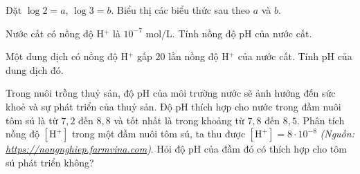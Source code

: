 \begin{bt}%
	Đặt $ \log 2=a $, $ \log 3=b $. Biểu thị các biểu thức sau theo $ a $ và $ b $.
\end{bt}

\begin{bt}%
	\begin{listEX}[1]
		\item[a)] Nước cất có nồng độ  H$^+ $ là $ 10^{-7} $ mol/L. Tính nồng độ pH của nước cất.
		\item[b)] Một dung dịch có nồng độ  H$^+ $ gấp $ 20 $ lần nồng độ  H$^+ $ của nước cất. Tính pH của dung dịch đó. 
	\end{listEX}
\end{bt}

\begin{bt} %
	Trong nuôi trồng thuỷ sản, độ $\mathrm{pH}$ của môi trường nước sẽ ảnh hưởng đến sức khoẻ và sự phát triển của thuỷ sản. Độ $\mathrm{pH}$ thích hợp cho nước trong đầm nuôi tôm sú là từ $7{,}2$ đến $8{,}8$ và tốt nhất là trong khoảng từ $7{,}8$ đến $8{,}5$. Phân tích nồng độ $\left[\mathrm{H}^{+}\right]$ trong một đầm nuôi tôm sú, ta thu được $\left[\mathrm{H}^{+}\right]=8 \cdot 10^{-8}$ \textit{(Nguồn: \href{https://nongnghiep.farmvina.com}{https://nongnghiep.farmvina.com})}. Hỏi độ pH của đầm đó có thích hợp cho tôm sú phát triển không?
\end{bt}


